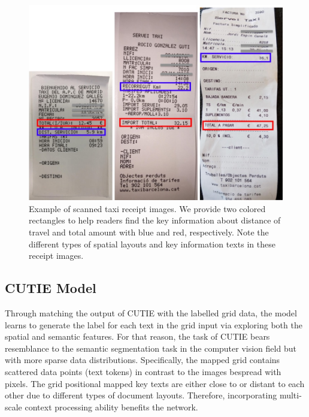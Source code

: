 \documentclass[10pt,twocolumn,letterpaper]{article}
\begin{document}
\begin{figure}
\begin{center}
\includegraphics[width=0.99\linewidth]{Receipts.jpg}
\end{center}
   \caption{Example of scanned taxi receipt images. We provide two colored rectangles to help readers find the key information about distance of travel and total amount with blue and red, respectively. Note the different types of spatial layouts and key information texts in these receipt images.}
\label{fig:receipts}
\end{figure}

\subsection{CUTIE Model}
Through matching the output of CUTIE with the labelled grid data, the model learns to generate the label for each text in the grid input via exploring both the spatial and semantic features. For that reason, the task of CUTIE bears resemblance to the semantic segmentation task in the computer vision field but with more sparse data distributions. Specifically, the mapped grid contains scattered data points (text tokens) in contrast to the images bespread with pixels. The grid positional mapped key texts are either close to or distant to each other due to different types of document layouts. Therefore, incorporating multi-scale context processing ability benefits the network.
\end{document}
